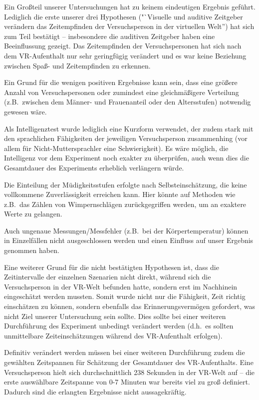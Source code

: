 \documentclass{Paper}
\begin{document}
Ein Großteil unserer Untersuchungen hat zu keinem eindeutigen Ergebnis geführt. Lediglich die erste unserer drei Hypothesen ("`Visuelle und auditive Zeitgeber verändern das Zeitempfinden der Versuchsperson in der virtuellen Welt'') hat sich zum Teil bestätigt -- insbesondere die auditiven Zeitgeber haben eine Beeinflussung gezeigt. Das Zeitempfinden der Versuchspersonen hat sich nach dem VR-Aufenthalt nur sehr geringfügig verändert und es war keine Beziehung zwischen Spaß- und Zeitempfinden zu erkennen.
 
Ein Grund für die wenigen positiven Ergebnisse kann sein, dass eine größere Anzahl von Versuchspersonen oder zumindest eine gleichmäßigere Verteilung (z.B.\ zwischen dem Männer- und Frauenanteil oder den Altersstufen) notwendig gewesen wäre.

Als Intelligenztest wurde lediglich eine Kurzform verwendet, der zudem stark mit den sprachlichen Fähigkeiten der jeweiligen Versuchsperson zusammenhing (vor allem für Nicht-Muttersprachler eine Schwierigkeit). Es wäre möglich, die Intelligenz vor dem Experiment noch exakter zu überprüfen, auch wenn dies die Gesamtdauer des Experiments erheblich verlängern würde.

Die Einteilung der Müdigkeitsstufen erfolgte nach Selbsteinschätzung, die keine vollkommene Zuverlässigkeit erreichen kann. Hier könnte auf Methoden wie z.B.\ das Zählen von Wimpernschlägen zurückgegriffen werden, um an exaktere Werte zu gelangen.

Auch ungenaue Messungen/Messfehler (z.B.\ bei der Körpertemperatur) können in Einzelfällen nicht ausgeschlossen werden und einen Einfluss auf unser Ergebnis genommen haben.

Eine weiterer Grund für die nicht bestätigten Hypothesen ist, dass die Zeitintervalle der einzelnen Szenarien nicht direkt, während sich die Versuchsperson in der VR-Welt befunden hatte, sondern erst im Nachhinein eingeschätzt werden mussten.
Somit wurde nicht nur die Fähigkeit, Zeit richtig einschätzen zu können, sondern
ebenfalls das Erinnerungsvermögen gefordert, was nicht Ziel unserer Untersuchung sein sollte. Dies sollte bei einer weiteren Durchführung des Experiment unbedingt verändert werden (d.h.\ es sollten unmittelbare Zeiteinschätzungen während des VR-Aufenthalt erfolgen).

Definitiv verändert werden müssen bei einer weiteren Durchführung zudem die gewählten Zeitspannen für Schätzung der Gesamtdauer des VR-Aufenthalts. Eine Versuchsperson hielt sich durchschnittlich 238 Sekunden in der VR-Welt auf -- die erste auswählbare Zeitspanne von 0-7 Minuten war bereits viel zu groß definiert. Dadurch sind die erlangten Ergebnisse nicht aussagekräftig.
\end{document}
